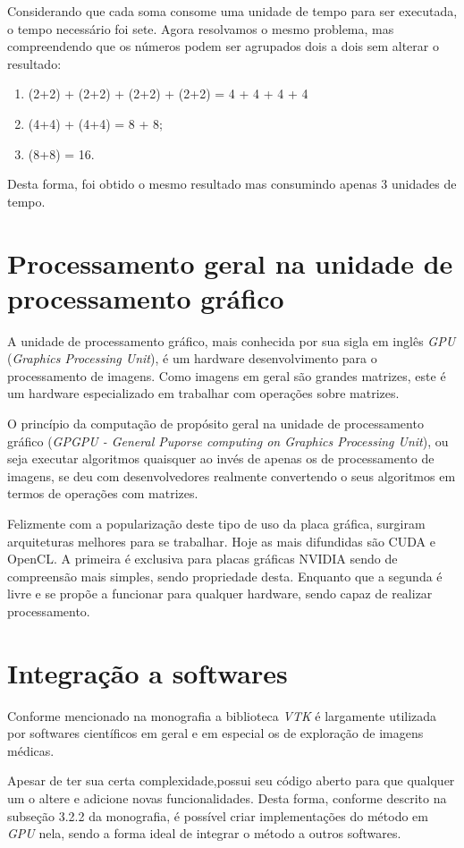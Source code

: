 \documentclass[a4paper,11pt]{report}
\begin{document}
    Considerando que cada soma consome uma unidade de tempo para ser executada, o tempo necessário foi sete. Agora resolvamos o mesmo problema, mas compreendendo que os números podem ser agrupados dois a dois sem alterar o resultado:
    \begin{enumerate}
      \item (2+2) + (2+2) + (2+2) + (2+2) = 4 + 4 + 4 + 4
      \item (4+4) + (4+4) = 8 + 8;
      \item (8+8) = 16.
    \end{enumerate}
    
    Desta forma, foi obtido o mesmo resultado mas consumindo apenas 3 unidades de tempo.
  
  \section{Processamento geral na unidade de processamento gráfico}
  A unidade de processamento gráfico, mais conhecida por sua sigla em inglês \textit{GPU} (\textit{Graphics Processing Unit}), é um hardware desenvolvimento para o processamento de imagens. Como imagens em geral são grandes matrizes, este é um hardware especializado em trabalhar com operações sobre matrizes.
  
  O princípio da computação de propósito geral na unidade de processamento gráfico (\textit{GPGPU - General Puporse computing on Graphics Processing Unit}), ou seja executar algoritmos quaisquer ao invés de apenas os de processamento de imagens, se deu com desenvolvedores realmente convertendo o seus algoritmos em termos de operações com matrizes.
  
  Felizmente com a popularização deste tipo de uso da placa gráfica, surgiram arquiteturas melhores para se trabalhar. Hoje as mais difundidas são CUDA e OpenCL. A primeira é exclusiva para placas gráficas NVIDIA sendo de compreensão mais simples, sendo propriedade desta. Enquanto que a segunda é livre e se propõe a funcionar para qualquer hardware, sendo capaz de realizar processamento.
  
  \section{Integração a softwares}
  Conforme mencionado na monografia a biblioteca \textit{VTK} é largamente utilizada por softwares científicos em geral e em especial os de exploração de imagens médicas.
  
  Apesar de ter sua certa complexidade,possui seu código aberto para que qualquer um o altere e adicione novas funcionalidades. Desta forma, conforme descrito na subseção 3.2.2 da monografia, é possível criar implementações do método em \textit{GPU} nela, sendo a forma ideal de integrar o método a outros softwares.
  
\end{document}
